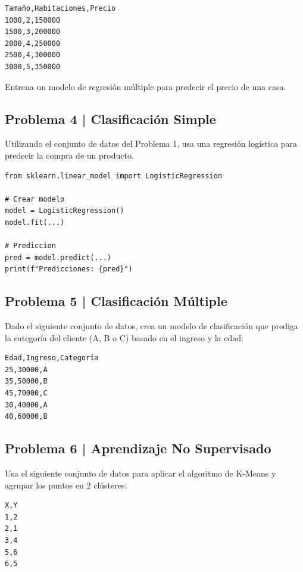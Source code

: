 \documentclass{article}
\begin{document}
\begin{verbatim}
Tamaño,Habitaciones,Precio
1000,2,150000
1500,3,200000
2000,4,250000
2500,4,300000
3000,5,350000
\end{verbatim}

Entrena un modelo de regresión múltiple para predecir el precio de una casa.

\clearpage

\subsection*{Problema 4 | Clasificación Simple}

Utilizando el conjunto de datos del Problema 1, usa una regresión logística para predecir la compra de un producto.

\begin{lstlisting}[style=python]
from sklearn.linear_model import LogisticRegression

# Crear modelo
model = LogisticRegression()
model.fit(...)

# Prediccion
pred = model.predict(...)
print(f"Predicciones: {pred}")
\end{lstlisting}

\clearpage

\subsection*{Problema 5 | Clasificación Múltiple}

Dado el siguiente conjunto de datos, crea un modelo de clasificación que prediga la categoría del cliente (A, B o C) basado en el ingreso y la edad:

\begin{verbatim}
Edad,Ingreso,Categoría
25,30000,A
35,50000,B
45,70000,C
30,40000,A
40,60000,B
\end{verbatim}

\clearpage

\subsection*{Problema 6 | Aprendizaje No Supervisado}

Usa el siguiente conjunto de datos para aplicar el algoritmo de K-Means y agrupar los puntos en 2 clústeres:

\begin{verbatim}
X,Y
1,2
2,1
3,4
5,6
6,5
\end{verbatim}
\end{document}
